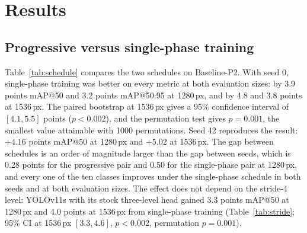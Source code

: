 \documentclass[preprint,12pt]{elsarticle}
\begin{document}
\section{Results}
\label{sec:results}

\subsection{Progressive versus single-phase training}
\label{sec:res-schedule}

Table~\ref{tab:schedule} compares the two schedules on Baseline-P2. With seed 0,
single-phase training was better on every metric at both evaluation sizes: by 3.9
points mAP@50 and 3.2 points mAP@50:95 at 1280\,px, and by 4.8 and 3.8 points at
1536\,px. The paired bootstrap at 1536\,px gives a 95\% confidence interval of
$[4.1, 5.5]$ points ($p<0.002$), and the permutation test gives $p=0.001$, the
smallest value attainable with 1000 permutations. Seed 42 reproduces the result:
$+4.16$ points mAP@50 at 1280\,px and $+5.02$ at 1536\,px. The gap between
schedules is an order of magnitude larger than the gap between seeds, which is
0.28 points for the progressive pair and 0.50 for the single-phase pair at
1280\,px, and every one of the ten classes improves under the single-phase
schedule in both seeds and at both evaluation sizes. The effect does not
depend on the stride-4 level: YOLOv11s with its stock three-level head gained 3.3
points mAP@50 at 1280\,px and 4.0 points at 1536\,px from single-phase training
(Table~\ref{tab:stride}; 95\% CI at 1536\,px $[3.3, 4.6]$, $p<0.002$, permutation
$p=0.001$).
\end{document}
